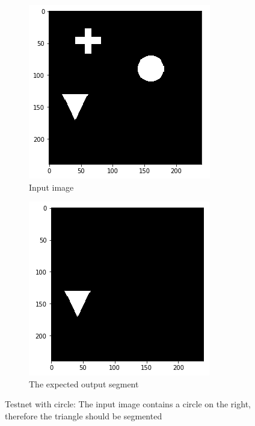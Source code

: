 \begin{figure}[H]
    \centering
    \begin{subfigure}[t]{.5\textwidth}
        \centering
        \includegraphics[width=\linewidth]{chapters/05_testnet/images/testnet_a-0.png}
        \caption{Input image}
    \end{subfigure}%
    \begin{subfigure}[t]{.5\textwidth}
        \centering
        \includegraphics[width=\linewidth]{chapters/05_testnet/images/testnet_a-1.png}
        \caption{The expected output segment}
    \end{subfigure}
    \caption{Testnet with circle: The input image contains a circle on the right, therefore the triangle should be segmented}
    \label{testnet_example_1}
\end{figure}

